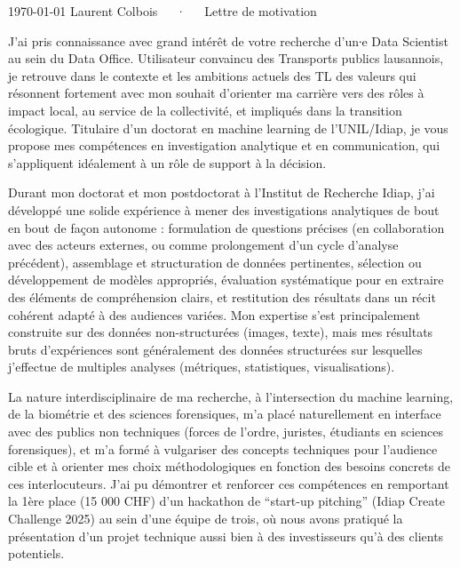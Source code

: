 \documentclass[11pt, a4paper]{awesome-cv}
\begin{document}
\makecvheader[R]

\makecvfooter
  {\today}
  {Laurent Colbois~~~·~~~Lettre de motivation}
  {}

\makelettertitle

\begin{cvletter}
J'ai pris connaissance avec grand intérêt de votre recherche d'un∙e Data Scientist au sein du Data Office.  Utilisateur convaincu des Transports publics lausannois, je retrouve dans le contexte et les ambitions actuels des TL des valeurs qui résonnent fortement avec mon souhait d'orienter ma carrière vers des rôles à impact local, au service de la collectivité, et impliqués dans la transition écologique. Titulaire d'un doctorat en machine learning de l'UNIL/Idiap, je vous propose mes compétences en investigation analytique et en communication, qui s'appliquent idéalement à un rôle de support à la décision.

Durant mon doctorat et mon postdoctorat à l'Institut de Recherche Idiap, j'ai développé une solide expérience à mener des investigations analytiques de bout en bout de façon autonome : formulation de questions précises (en collaboration avec des acteurs externes, ou comme prolongement d'un cycle d'analyse précédent), assemblage et structuration de données pertinentes, sélection ou développement de modèles appropriés, évaluation systématique pour en extraire des éléments de compréhension clairs, et restitution des résultats dans un récit cohérent adapté à des audiences variées. Mon expertise s'est principalement construite sur des données non-structurées (images, texte), mais mes résultats bruts d'expériences sont généralement des données structurées sur lesquelles j'effectue de multiples analyses (métriques, statistiques, visualisations).

La nature interdisciplinaire de ma recherche, à l'intersection du machine learning, de la biométrie et des sciences forensiques, m'a placé naturellement en interface avec des publics non techniques (forces de l'ordre, juristes, étudiants en sciences forensiques), et m'a formé à vulgariser des concepts techniques pour l'audience cible et à orienter mes choix méthodologiques en fonction des besoins concrets de ces interlocuteurs. J'ai pu démontrer et renforcer ces compétences en remportant la 1ère place (15 000 CHF) d'un hackathon de ``start-up pitching'' (Idiap Create Challenge 2025) au sein d'une équipe de trois, où nous avons pratiqué la présentation d'un projet technique aussi bien à des investisseurs qu'à des clients potentiels.


\end{cvletter}
\end{document}
